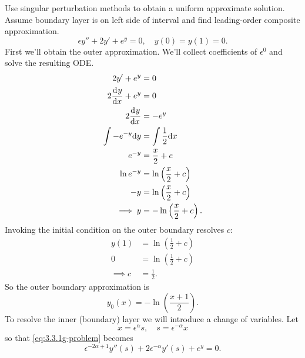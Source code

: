 \begin{description}
    {\tiny Use singular perturbation methods to obtain a uniform approximate
      solution. Assume boundary layer is on left side of interval and find
      leading-order composite approximation.
      \begin{equation}
        \label{eq:3.3.1g-problem}
        \epsilon y''+2y'+e^y=0,\quad y(0)=y(1)=0.
      \end{equation}
      First we'll obtain the outer approximation. We'll collect coefficients of
      $\epsilon^0$ and solve the resulting ODE.\@
      \begin{equation*}
        \begin{aligned}
          2y'+e^y&=0 \\
          2\frac{\mathrm{d}^{} {y}}{\mathrm{d}{x}^{}}+e^y&=0 \\
          2\frac{\mathrm{d}^{} {y}}{\mathrm{d}{x}^{}} &= -e^y \\
          \int -e^{-y} \mathrm{d}{y} &= \int\frac{1}{2} \mathrm{d}{x} \\
          e^{-y} &= \frac{x}{2}+c \\
          \ln e^{-y} &= \ln\left( \frac{x}{2}+c \right) \\
          -y &= \ln\left( \frac{x}{2}+c \right) \\
          \implies y &= -\ln\left( \frac{x}{2}+c \right).
        \end{aligned}
      \end{equation*}
      Invoking the initial condition on the outer boundary resolves $c$:
      \begin{equation*}
        \begin{aligned}
          y(1) &= \ln\left( \frac{1}{2}+c \right) \\
          0 &= \ln\left( \frac{1}{2}+c \right) \\
          \implies c &= \frac{1}{2}.
        \end{aligned}
      \end{equation*}
      So the outer boundary approximation is
      \begin{equation*}
        \boxed{y_0(x) = -\ln\left( \frac{x+1}{2} \right).}
      \end{equation*}
      To resolve the inner (boundary) layer we will introduce a change of variables.
      Let
      \begin{equation*}
        x=\epsilon^{\alpha}s,\quad s=\epsilon^{-\alpha}x
      \end{equation*}
      so that \cref{eq:3.3.1g-problem} becomes
      \begin{equation*}
        \epsilon^{-2\alpha+1}y''(s) + 2\epsilon^{-\alpha}y'(s) + e^y = 0.

\end{equation*}}
\end{description}
